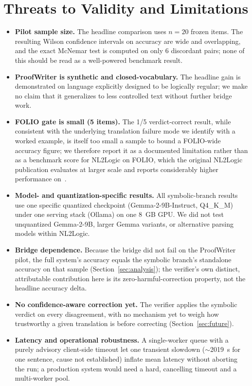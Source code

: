 \documentclass[conference]{IEEEtran}
\begin{document}
\section{Threats to Validity and Limitations}
\label{sec:threats}

\begin{itemize}
\item \textbf{Pilot sample size.} The headline comparison uses $n=20$ frozen items. The resulting Wilson confidence intervals on accuracy are wide and overlapping, and the exact McNemar test is computed on only 6 discordant pairs; none of this should be read as a well-powered benchmark result.
\item \textbf{ProofWriter is synthetic and closed-vocabulary.} The headline gain is demonstrated on language explicitly designed to be logically regular; we make no claim that it generalizes to less controlled text without further bridge work.
\item \textbf{FOLIO gate is small (5 items).} The 1/5 verdict-correct result, while consistent with the underlying translation failure mode we identify with a worked example, is itself too small a sample to bound a FOLIO-wide accuracy figure; we therefore report it as a documented limitation rather than as a benchmark score for NL2Logic on FOLIO, which the original NL2Logic publication evaluates at larger scale and reports considerably higher performance on~\cite{putra2026nl2logic}.
\item \textbf{Model- and quantization-specific results.} All symbolic-branch results use one specific quantized checkpoint (Gemma-2-9B-Instruct, Q4\_K\_M) under one serving stack (Ollama) on one 8~GB GPU. We did not test unquantized Gemma-2-9B, larger Gemma variants, or alternative parsing models within NL2Logic.
\item \textbf{Bridge dependence.} Because the bridge did not fail on the ProofWriter pilot, the full system's accuracy equals the symbolic branch's standalone accuracy on that sample (Section~\ref{sec:analysis}); the verifier's own distinct, attributable contribution here is its zero-harmful-correction property, not the headline accuracy delta.
\item \textbf{No confidence-aware correction yet.} The verifier applies the symbolic verdict on every disagreement, with no mechanism yet to weigh how trustworthy a given translation is before correcting (Section~\ref{sec:future}).
\item \textbf{Latency and operational robustness.} A single-worker queue with a purely advisory client-side timeout let one transient slowdown ($\sim$2019~s for one sentence, cause not established) inflate mean latency without aborting the run; a production system would need a hard, cancelling timeout and a multi-worker pool.

\end{itemize}
\end{document}
